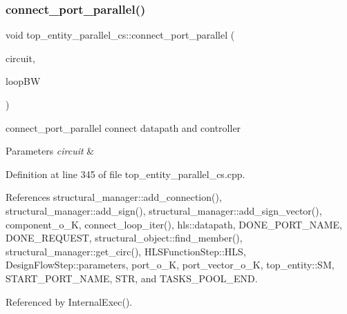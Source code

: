 \subsubsection{\texorpdfstring{connect\+\_\+port\+\_\+parallel()}{connect\_port\_parallel()}}
{\footnotesize\ttfamily void top\+\_\+entity\+\_\+parallel\+\_\+cs\+::connect\+\_\+port\+\_\+parallel (\begin{DoxyParamCaption}\item[{const \hyperlink{structural__objects_8hpp_a8ea5f8cc50ab8f4c31e2751074ff60b2}{structural\+\_\+object\+Ref}}]{circuit,  }\item[{unsigned}]{loop\+BW }\end{DoxyParamCaption})\hspace{0.3cm}{\ttfamily [protected]}}



connect\+\_\+port\+\_\+parallel connect datapath and controller 


\begin{DoxyParams}{Parameters}
{\em circuit} & \\
\hline
\end{DoxyParams}


Definition at line 345 of file top\+\_\+entity\+\_\+parallel\+\_\+cs.\+cpp.



References structural\+\_\+manager\+::add\+\_\+connection(), structural\+\_\+manager\+::add\+\_\+sign(), structural\+\_\+manager\+::add\+\_\+sign\+\_\+vector(), component\+\_\+o\+\_\+K, connect\+\_\+loop\+\_\+iter(), hls\+::datapath, D\+O\+N\+E\+\_\+\+P\+O\+R\+T\+\_\+\+N\+A\+ME, D\+O\+N\+E\+\_\+\+R\+E\+Q\+U\+E\+ST, structural\+\_\+object\+::find\+\_\+member(), structural\+\_\+manager\+::get\+\_\+circ(), H\+L\+S\+Function\+Step\+::\+H\+LS, Design\+Flow\+Step\+::parameters, port\+\_\+o\+\_\+K, port\+\_\+vector\+\_\+o\+\_\+K, top\+\_\+entity\+::\+SM, S\+T\+A\+R\+T\+\_\+\+P\+O\+R\+T\+\_\+\+N\+A\+ME, S\+TR, and T\+A\+S\+K\+S\+\_\+\+P\+O\+O\+L\+\_\+\+E\+ND.



Referenced by Internal\+Exec().

